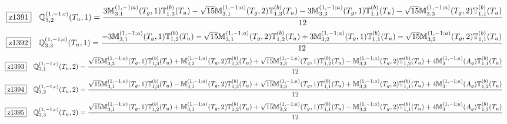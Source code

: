 \documentclass[fleqn,10pt,landscape]{jsarticle}
\begin{document}
\begin{dmath*}
\hspace*{3mm}\fbox{z1391}\quad \mathbb{Q}_{3,2}^{(1,-1;c)}(T_{u},1)=\frac{3 \mathbb{M}_{3,1}^{(1,-1;a)}(T_{g},1) \mathbb{T}_{1,3}^{(b)}(T_{u}) - \sqrt{15} \mathbb{M}_{3,1}^{(1,-1;a)}(T_{g},2) \mathbb{T}_{1,3}^{(b)}(T_{u}) - 3 \mathbb{M}_{3,3}^{(1,-1;a)}(T_{g},1) \mathbb{T}_{1,1}^{(b)}(T_{u}) - \sqrt{15} \mathbb{M}_{3,3}^{(1,-1;a)}(T_{g},2) \mathbb{T}_{1,1}^{(b)}(T_{u})}{12}
\end{dmath*}
\begin{dmath*}
\hspace*{3mm}\fbox{z1392}\quad \mathbb{Q}_{3,3}^{(1,-1;c)}(T_{u},1)=\frac{- 3 \mathbb{M}_{3,1}^{(1,-1;a)}(T_{g},1) \mathbb{T}_{1,2}^{(b)}(T_{u}) - \sqrt{15} \mathbb{M}_{3,1}^{(1,-1;a)}(T_{g},2) \mathbb{T}_{1,2}^{(b)}(T_{u}) + 3 \mathbb{M}_{3,2}^{(1,-1;a)}(T_{g},1) \mathbb{T}_{1,1}^{(b)}(T_{u}) - \sqrt{15} \mathbb{M}_{3,2}^{(1,-1;a)}(T_{g},2) \mathbb{T}_{1,1}^{(b)}(T_{u})}{12}
\end{dmath*}
\begin{dmath*}
\hspace*{3mm}\fbox{z1393}\quad \mathbb{Q}_{3,1}^{(1,-1;c)}(T_{u},2)=\frac{\sqrt{15} \mathbb{M}_{3,2}^{(1,-1;a)}(T_{g},1) \mathbb{T}_{1,3}^{(b)}(T_{u}) + \mathbb{M}_{3,2}^{(1,-1;a)}(T_{g},2) \mathbb{T}_{1,3}^{(b)}(T_{u}) + \sqrt{15} \mathbb{M}_{3,3}^{(1,-1;a)}(T_{g},1) \mathbb{T}_{1,2}^{(b)}(T_{u}) - \mathbb{M}_{3,3}^{(1,-1;a)}(T_{g},2) \mathbb{T}_{1,2}^{(b)}(T_{u}) + 4 \mathbb{M}_{3}^{(1,-1;a)}(A_{g}) \mathbb{T}_{1,1}^{(b)}(T_{u})}{12}
\end{dmath*}
\begin{dmath*}
\hspace*{3mm}\fbox{z1394}\quad \mathbb{Q}_{3,2}^{(1,-1;c)}(T_{u},2)=\frac{\sqrt{15} \mathbb{M}_{3,1}^{(1,-1;a)}(T_{g},1) \mathbb{T}_{1,3}^{(b)}(T_{u}) - \mathbb{M}_{3,1}^{(1,-1;a)}(T_{g},2) \mathbb{T}_{1,3}^{(b)}(T_{u}) + \sqrt{15} \mathbb{M}_{3,3}^{(1,-1;a)}(T_{g},1) \mathbb{T}_{1,1}^{(b)}(T_{u}) + \mathbb{M}_{3,3}^{(1,-1;a)}(T_{g},2) \mathbb{T}_{1,1}^{(b)}(T_{u}) + 4 \mathbb{M}_{3}^{(1,-1;a)}(A_{g}) \mathbb{T}_{1,2}^{(b)}(T_{u})}{12}
\end{dmath*}
\begin{dmath*}
\hspace*{3mm}\fbox{z1395}\quad \mathbb{Q}_{3,3}^{(1,-1;c)}(T_{u},2)=\frac{\sqrt{15} \mathbb{M}_{3,1}^{(1,-1;a)}(T_{g},1) \mathbb{T}_{1,2}^{(b)}(T_{u}) + \mathbb{M}_{3,1}^{(1,-1;a)}(T_{g},2) \mathbb{T}_{1,2}^{(b)}(T_{u}) + \sqrt{15} \mathbb{M}_{3,2}^{(1,-1;a)}(T_{g},1) \mathbb{T}_{1,1}^{(b)}(T_{u}) - \mathbb{M}_{3,2}^{(1,-1;a)}(T_{g},2) \mathbb{T}_{1,1}^{(b)}(T_{u}) + 4 \mathbb{M}_{3}^{(1,-1;a)}(A_{g}) \mathbb{T}_{1,3}^{(b)}(T_{u})}{12}
\end{dmath*}
\end{document}
